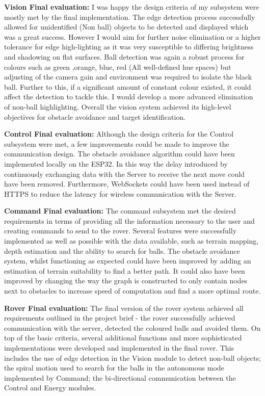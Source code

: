 \documentclass[10pt,twoside]{article}
\begin{document}
\textbf{Vision Final evaluation:} I was happy the design criteria of my subsystem were mostly met by the final implementation. The edge detection process successfully allowed for unidentified (Non ball) objects to be detected and displayed which was a great success. However I would aim for further noise elimination or a higher tolerance for edge high-lighting as it was very susceptible to differing brightness and shadowing on flat surfaces.  Ball detection was again a robust process for colours such as green ,orange, blue, red (All well-defined hue spaces) but adjusting of the camera gain and environment was required to isolate the black ball. Further to this, if a significant amount of constant colour existed, it could affect the detection to tackle this. I would develop a more advanced elimination of non-ball highlighting. Overall the vision system achieved its high-level objectives for obstacle avoidance and target identification. 

\textbf{Control Final evaluation:} Although the design criteria for the Control subsystem were met, a few improvements could be made to improve the communication design. The obstacle avoidance algorithm could have been implemented locally on the ESP32. In this way the delay introduced by continuously exchanging data with the Server to receive the next move could have been removed. Furthermore, WebSockets could have been used instead of HTTPS to reduce the latency for wireless communication with the Server.

\textbf{Command Final evaluation:} The command subsystem met the desired requirements in terms of providing all the information necessary to the user and creating commands to send to the rover. Several features were successfully implemented as well as possible with the data available, such as terrain mapping, depth estimation and the ability to search for balls. The obstacle avoidance system, whilst functioning as expected could have been improved by adding an estimation of terrain suitability to find a better path. It could also have been improved by changing the way the graph is constructed to only contain nodes next to obstacles to increase speed of computation and find a more optimal route. 

\textbf{Rover Final evaluation:} The final version of the rover system achieved all requirements outlined in the project brief - the rover successfully achieved communication with the server, detected the coloured balls and avoided them. On top of the basic criteria, several additional functions and more sophisticated implementations were developed and implemented in the final rover. This includes the use of edge detection in the Vision module to detect non-ball objects; the spiral motion used to search for the balls in the autonomous mode implemented by Command; the bi-directional communication between the Control and Energy modules.
\end{document}
